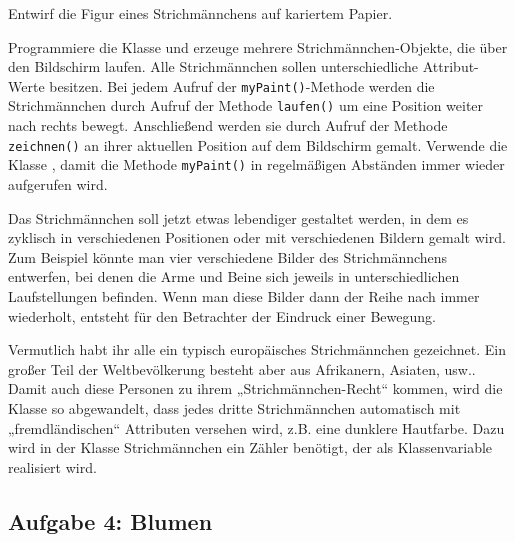 \begin{compactenum}[a)]
\item Entwirf die Figur eines Strichmännchens auf kariertem Papier.

\item Programmiere die Klasse  und erzeuge mehrere
Strichmännchen-Objekte, die über den Bildschirm laufen. Alle Strichmännchen
sollen unterschiedliche Attribut-Werte besitzen. Bei jedem Aufruf der
\lstinline|myPaint()|-Methode werden die Strichmännchen durch Aufruf der
Methode \lstinline|laufen()| um eine Position weiter nach rechts bewegt.
Anschließend werden sie durch Aufruf der Methode \lstinline|zeichnen()| an ihrer
aktuellen Position auf dem Bildschirm gemalt. Verwende die Klasse
, damit die Methode \lstinline|myPaint()| in regelmäßigen
Abständen immer wieder aufgerufen wird.

\item Das Strichmännchen soll jetzt etwas lebendiger gestaltet werden, in dem
es zyklisch in verschiedenen Positionen oder mit verschiedenen Bildern gemalt
wird. Zum Beispiel könnte man vier verschiedene Bilder des Strichmännchens
entwerfen, bei denen die Arme und Beine sich jeweils in unterschiedlichen
Laufstellungen befinden. Wenn man diese Bilder dann der Reihe nach immer
wiederholt, entsteht für den Betrachter der Eindruck einer Bewegung.

\item Vermutlich habt ihr alle ein typisch europäisches Strichmännchen
gezeichnet. Ein großer Teil der Weltbevölkerung besteht aber aus Afrikanern,
Asiaten, usw.. Damit auch diese Personen zu ihrem „Strichmännchen-Recht“
kommen, wird die Klasse  so abgewandelt, dass jedes
dritte Strichmännchen automatisch mit „fremdländischen“ Attributen versehen
wird, z.B. eine dunklere Hautfarbe. Dazu wird in der Klasse Strichmännchen ein
Zähler benötigt, der als Klassenvariable realisiert wird.
\end{compactenum}


\subsection{Aufgabe 4: Blumen}

